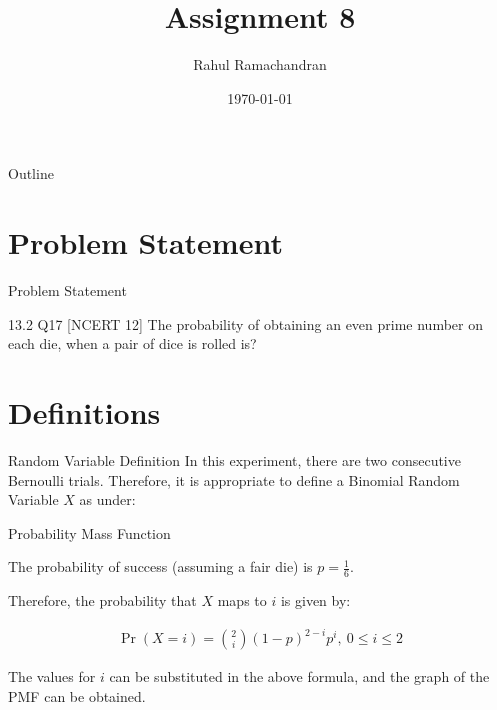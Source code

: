 \documentclass{beamer}
\title{Assignment 8}
\author{Rahul Ramachandran}
\date{\today}
\providecommand{\pr}[1]{\ensuremath{\Pr\left(#1\right)}}
\begin{document}
\begin{frame}
    \titlepage 
\end{frame}

\logo{}


\begin{frame}{Outline}
    \tableofcontents
\end{frame}



\section{Problem Statement}
\begin{frame}{Problem Statement}
    \begin{block}{13.2 Q17 [NCERT 12] } The probability of obtaining an even prime number on each die, when a pair of dice is rolled is?
    \end{block}
\end{frame}



\section{Definitions}
\begin{frame}{Random Variable Definition}
In this experiment, there are two consecutive Bernoulli trials. Therefore, it is appropriate to define a Binomial Random Variable $X$ as under:


\begin{table}[ht!]
    \centering
    
    \caption{Random Variable $X$}
	\label{table:table1}
\end{table}

  
\end{frame}



\begin{frame}{Probability Mass Function}

The probability of success (assuming a fair die) is $p=\frac{1}{6}$.

Therefore, the probability that $X$ maps to $i$ is given by:
\begin{block}{}
       \begin{align}
                \label{eq1}
           \pr{X=i} = \binom{2}{i} (1-p)^{2-i} p^i ,~ 0 \le i \le 2 
       \end{align}
\end{block}

The values for $i$ can be substituted in the above formula, and the graph of the PMF can be obtained.
\end{frame}
\end{document}
